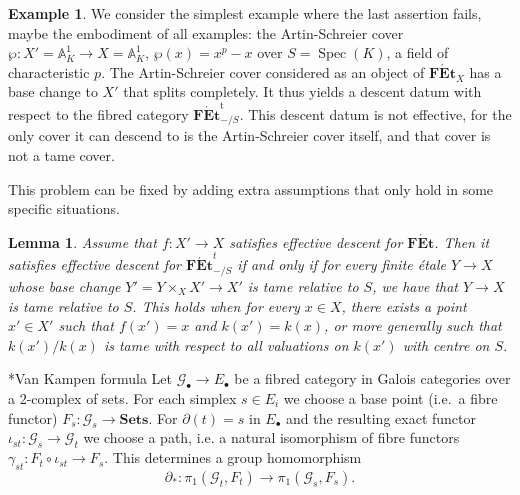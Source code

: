 \documentclass[a4paper,twoside,11pt,reqno]{amsart}
\makeatletter
\renewcommand{\mathbb}{\mathds}
\newcommand{\bA}{{\mathbb A}}
\newcommand{\cG}{{\mathcal G}}
\newcommand{\la}{\longrightarrow}
\DeclareMathOperator{\Spec}{Spec}
\newcommand{\cat}[1]{\mathbf{#1}}
\newcommand{\FEt}{\cat{F\acute{E}t}}
\newcommand{\Sets}{\cat{Sets}}
\newcommand{\FEtt}{{\cat{F\acute{E}t}}^{\!\mathrm{t}}}
\def\subsubsection{\@startsection{subsubsection}{3}%
      \z@{.5\linespacing\@plus.7\linespacing}{-.5em}%
      {\normalfont\bfseries}}
\newtheorem{lem}[thm]{Lemma}
\theoremstyle{definition}
\newtheorem{ex}[thm]{Example}
\numberwithin{equation}{subsection}
\makeatother
\begin{document}
\begin{ex}
We consider the simplest example where the last assertion fails, maybe the embodiment of all examples: the Artin-Schreier cover $\wp \colon X' = \bA^1_K \to X = \bA^1_K$, $\wp(x) = x^p - x$ over $S = \Spec(K)$, a field of characteristic $p$. The Artin-Schreier cover considered as an object of $\FEt_X$ has a base change to $X'$ that splits completely. It thus yields a descent datum with respect to the fibred category $\FEtt_{-/S}$. This descent datum is not effective, for the only cover it can descend to is the Artin-Schreier cover itself, and that cover is not a tame cover.
\end{ex}

This problem can be fixed by adding extra assumptions that only hold in some specific situations.

\begin{lem}\label{lem:f-eff-desc-for-FEt-and-FEtt}
    Assume that $f\colon X'\to X$ satisfies effective descent for $\FEt$. Then it satisfies effective descent for $\FEt^t_{-/S}$ if and only if for every finite \'etale $Y\to X$ whose base change $Y'=Y\times_X X'\to X'$ is tame relative to $S$, we have that $Y\to X$ is tame relative to $S$. This holds when for every $x\in X$, there exists a point $x'\in X'$ such that $f(x')=x$ and $k(x')=k(x)$, or more generally such that $k(x')/k(x)$ is tame with respect to all valuations on $k(x')$ with centre on $S$.
\end{lem}

\subsubsection*{Van Kampen formula} 
Let $\cG_\bullet \to E_\bullet$ be a fibred category in Galois categories over a $2$-complex of sets. For each simplex $s \in E_i$ we choose a base point (i.e.\ a fibre functor) $F_s \colon \cG_s \to \Sets$.
For $\partial(t) = s$ in $E_\bullet$ and the resulting exact functor $\iota_{st} \colon \cG_s \to \cG_t$ we choose a path, i.e. a natural isomorphism of fibre functors  $\gamma_{st} \colon F_t \circ \iota_{st} \to F_s$. This determines a group homomorphism 
\begin{equation}
\label{eq:boundary map 2-complex of pi1s}
    \partial_\ast \colon \pi_1(\cG_t ,F_t)\la \pi_1(\cG_s,F_s).
\end{equation}
\end{document}
